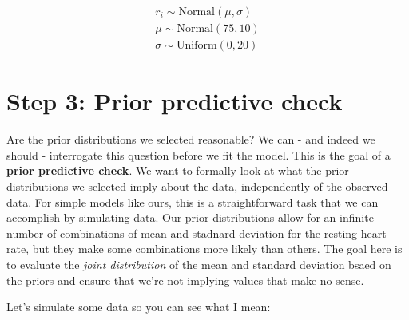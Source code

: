 \documentclass[
]{book}
\begin{document}
\[
\begin{array}{l}
r_i \sim \mathrm{Normal}(\mu, \sigma) \\
\mu \sim \mathrm{Normal}(75, 10) \\
\sigma \sim \mathrm{Uniform}(0, 20)
\end{array}
\]

\section{Step 3: Prior predictive check}\label{step-3-prior-predictive-check}

Are the prior distributions we selected reasonable? We can - and indeed we should - interrogate this question before we fit the model. This is the goal of a \textbf{prior predictive check}. We want to formally look at what the prior distributions we selected imply about the data, independently of the observed data. For simple models like ours, this is a straightforward task that we can accomplish by simulating data. Our prior distributions allow for an infinite number of combinations of mean and stadnard deviation for the resting heart rate, but they make some combinations more likely than others. The goal here is to evaluate the \emph{joint distribution} of the mean and standard deviation bsaed on the priors and ensure that we're not implying values that make no sense.

Let's simulate some data so you can see what I mean:
\end{document}
